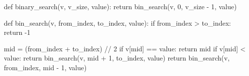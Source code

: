 \begin{unipdcode}[language=Python]
def binary_search(v, v_size, value):
    return bin_search(v, 0, v_size - 1, value)


def bin_search(v, from_index, to_index, value):
    if from_index > to_index:
        return -1

    mid = (from_index + to_index) // 2
    if v[mid] == value:
        return mid
    if v[mid] < value:
        return bin_search(v, mid + 1, to_index, value)
    return bin_search(v, from_index, mid - 1, value)
\end{unipdcode}
